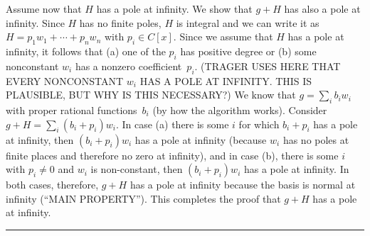 \documentclass[a4paper,draft]{article}
\begin{document}
Assume now that $H$ has a pole at infinity. We show that $g+H$ has also a pole at infinity. 
Since $H$ has no finite poles, $H$ is integral and we can write it as
$H=p_1w_1+\cdots+p_nw_n$ with $p_i\in C[x]$.
Since we assume that $H$ has a pole at infinity, it follows that (a) one of the $p_i$ has positive degree
or (b) some nonconstant $w_i$ has a nonzero coefficient~$p_i$.
(TRAGER USES HERE THAT EVERY NONCONSTANT $w_i$ HAS A POLE AT INFINITY. THIS IS PLAUSIBLE, BUT
WHY IS THIS NECESSARY?)
We know that $g=\sum_i b_iw_i$ with proper rational functions~$b_i$ (by how the algorithm works).
Consider $g+H=\sum_i (b_i+p_i)w_i$.
In case (a) there is some $i$ for which $b_i+p_i$ has a pole at infinity, then $(b_i+p_i)w_i$ has a pole
at infinity (because $w_i$ has no poles at finite places and therefore no zero at infinity),
and in case (b), there is some $i$ with $p_i\neq 0$ and $w_i$ is non-constant, then $(b_i+p_i)w_i$ has a
pole at infinity.
In both cases, therefore, $g+H$ has a pole at infinity because the basis is normal
at infinity (``MAIN PROPERTY'').
This completes the proof that $g+H$ has a pole at infinity. \rule{1ex}{1ex}

  
\end{document}
